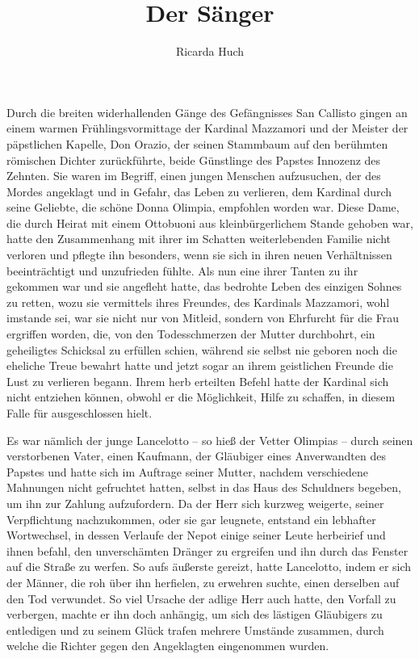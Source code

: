 \usepackage[german,ngerman]{babel}
\usepackage[T1]{fontenc}




\raggedbottom

\author{Ricarda Huch}
\title{Der Sänger}
\date{}
\lowertitleback{Diese Ausgabe basiert auf dem
  \href{http://www.gutenberg.net/}{Project Gutenberg}
  EBook \#27446.}

\maketitle

\pagenum{[55]} Durch die breiten widerhallenden Gänge des
Gefängnisses San Callisto gingen an einem warmen
Frühlingsvormittage der Kardinal Mazzamori und der Meister der
päpstlichen Kapelle, Don Orazio, der seinen Stammbaum auf den
berühmten römischen Dichter zurückführte, beide Günstlinge des
Papstes Innozenz des Zehnten. Sie waren im Begriff, einen jungen
Menschen aufzusuchen, der des Mordes angeklagt und in Gefahr, das
Leben zu verlieren, dem Kardinal durch seine Geliebte, die schöne
Donna Olimpia, empfohlen worden war. Diese Dame, die durch Heirat
mit einem Ottobuoni aus kleinbürgerlichem Stande gehoben war, hatte
den Zusammenhang mit ihrer im Schatten weiterlebenden Familie nicht
verloren und pflegte ihn besonders, wenn sie sich in ihren neuen
Verhältnissen beeinträchtigt und unzufrieden fühlte. Als nun eine
ihrer Tanten zu ihr gekommen war und sie angefleht hatte, das
bedrohte Leben des einzigen Sohnes zu retten, wozu sie vermittels
ihres Freundes, des Kardinals Mazzamori, wohl imstande sei, war sie
nicht nur von Mitleid, sondern von Ehrfurcht für die Frau ergriffen
worden, die, von den Todesschmerzen der Mutter durchbohrt, ein
geheiligtes Schicksal zu erfüllen schien, während sie selbst nie
geboren noch die eheliche Treue bewahrt hatte und jetzt sogar an
ihrem geistlichen Freunde die Lust zu verlieren begann. Ihrem herb
erteilten Befehl hatte der \pagenum{[56]} Kardinal sich nicht
entziehen können, obwohl er die Möglichkeit, Hilfe zu schaffen, in
diesem Falle für ausgeschlossen hielt.

Es war nämlich der junge Lancelotto – so hieß der Vetter Olimpias –
durch seinen verstorbenen Vater, einen Kaufmann, der Gläubiger
eines Anverwandten des Papstes und hatte sich im Auftrage seiner
Mutter, nachdem verschiedene Mahnungen nicht gefruchtet hatten,
selbst in das Haus des Schuldners begeben, um ihn zur Zahlung
aufzufordern. Da der Herr sich kurzweg weigerte, seiner
Verpflichtung nachzukommen, oder sie gar leugnete, entstand ein
lebhafter Wortwechsel, in dessen Verlaufe der Nepot einige seiner
Leute herbeirief und ihnen befahl, den unverschämten Dränger zu
ergreifen und ihn durch das Fenster auf die Straße zu werfen. So
aufs äußerste gereizt, hatte Lancelotto, indem er sich der Männer,
die roh über ihn herfielen, zu erwehren suchte, einen derselben auf
den Tod verwundet. So viel Ursache der adlige Herr auch hatte, den
Vorfall zu verbergen, machte er ihn doch anhängig, um sich des
lästigen Gläubigers zu entledigen und zu seinem Glück trafen
mehrere Umstände zusammen, durch welche die Richter gegen den
Angeklagten eingenommen wurden.

